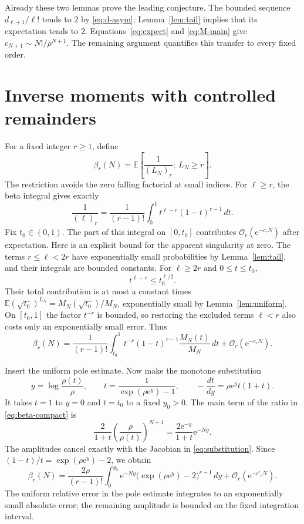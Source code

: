 \documentclass[11pt,letterpaper]{article}
\numberwithin{equation}{section}
\theoremstyle{remark}\newtheorem{remark}[theorem]{Remark}
\newcommand{\E}{\mathbb E}
\newcommand{\e}{\mathrm e}
\newcommand{\Ord}{\mathcal O}
\newcommand{\fall}[2]{(#1)_{\underline{#2}}}
\begin{document}
Already these two lemmas prove the leading conjecture. The bounded sequence $d_{\ell+1}/\ell!$ tends to $2$ by \eqref{eq:d-asym}; Lemma~\ref{lem:tail} implies that its expectation tends to $2$. Equations~\eqref{eq:expect} and \eqref{eq:M-main} give $c_{N+1}\sim N!/\rho^{N+1}$. The remaining argument quantifies this transfer to every fixed order.

\section{Inverse moments with controlled remainders}
\label{sec:moments}
For a fixed integer $r\ge1$, define
\begin{equation}\label{eq:beta-def}
 \beta_r(N)=\E\left[\frac1{\fall{L_N}{r}};\ L_N\ge r\right].
\end{equation}
The restriction avoids the zero falling factorial at small indices. For $\ell\ge r$, the beta integral gives exactly
\begin{equation}\label{eq:beta-integral}
 \frac1{\fall{\ell}{r}}
 =\frac1{(r-1)!}\int_0^1t^{\ell-r}(1-t)^{r-1}\,dt.
\end{equation}
Fix $t_0\in(0,1)$. The part of this integral on $[0,t_0]$ contributes $\Ord_r(\e^{-c_rN})$ after expectation. Here is an explicit bound for the apparent singularity at zero. The terms $r\le\ell<2r$ have exponentially small probabilities by Lemma~\ref{lem:tail}, and their integrals are bounded constants. For $\ell\ge2r$ and $0\le t\le t_0$,
\[
 t^{\ell-r}\le t_0^{\ell/2}.
\]
Their total contribution is at most a constant times
$\E(\sqrt{t_0})^{L_N}=M_N(\sqrt{t_0})/M_N$, exponentially small by Lemma~\ref{lem:uniform}. On $[t_0,1]$ the factor $t^{-r}$ is bounded, so restoring the excluded terms $\ell<r$ also costs only an exponentially small error. Thus
\begin{equation}\label{eq:beta-compact}
 \beta_r(N)=\frac1{(r-1)!}\int_{t_0}^{1}
 t^{-r}(1-t)^{r-1}\frac{M_N(t)}{M_N}\,dt
                  +\Ord_r(\e^{-c_rN}).
\end{equation}

Insert the uniform pole estimate. Now make the monotone substitution
\begin{equation}\label{eq:substitution}
 y=\log\frac{\rho(t)}\rho,\qquad
 t=\frac1{\exp(\rho\e^y)-1},\qquad
 -\frac{dt}{dy}=\rho\e^y t(1+t).
\end{equation}
It takes $t=1$ to $y=0$ and $t=t_0$ to a fixed $y_0>0$. The main term of the ratio in \eqref{eq:beta-compact} is
\[
 \frac2{1+t}\left(\frac\rho{\rho(t)}\right)^{N+1}
 =\frac{2\e^{-y}}{1+t}\e^{-Ny}.
\]
The amplitudes cancel exactly with the Jacobian in \eqref{eq:substitution}. Since $(1-t)/t=\exp(\rho\e^y)-2$, we obtain
\begin{equation}\label{eq:beta-laplace}
 \beta_r(N)=\frac{2\rho}{(r-1)!}\int_0^{y_0}\e^{-Ny}
       \bigl(\exp(\rho\e^y)-2\bigr)^{r-1}\,dy
                    +\Ord_r(\e^{-c'_rN}).
\end{equation}
The uniform relative error in the pole estimate integrates to an exponentially small absolute error; the remaining amplitude is bounded on the fixed integration interval.
\end{document}
